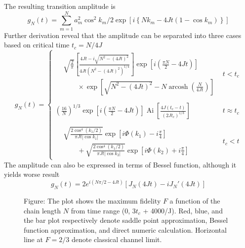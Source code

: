 \documentclass[../../../main.tex]{subfiles}
\begin{document}
The resulting transition amplitude is
\begin{equation*}
  g_N(t) = \sum_{m =1} ^{N} a_m ^ 2\cos^2 k_m/2 \exp \left[i \left\{Nk_m - 4Jt (1-\cos k_m)  \right\}  \right]
\end{equation*}
Further derivation reveal that the amplitude can be separated into three cases based on critical time $t_c = N/4J$
\begin{equation*}
  g_N(t) =
  \begin{cases}
    \begin{aligned}
       & \sqrt{\frac{2}{\pi}} \left[ \frac{4Jt - i \sqrt{N^2 - (4Jt)^2}}{4Jt \left( N^2 - (4Jt)^2 \right)^{1/4}} \right]
      \exp\left[ i\left( \frac{\pi N}{2} - 4Jt \right) \right]                                                           \\
       & \qquad \times \exp\left[\sqrt{N^2 - (4Jt)^2} -N \operatorname{arcosh} \left(\frac{N}{4Jt}\right)  \right]
    \end{aligned}
     & t<t_c         \\\\
    \left(\frac{16}{N}\right)^{1/3} \exp \left[ i \left( \frac{\pi N}{2} - 4Jt \right) \right] \operatorname{Ai}\left[ \frac{4J(t_c - t) }{(2Jt_c)^{1/3}}   \right]
     & t \approx t_c \\\\
    \begin{aligned}
       & \sqrt{\frac{2 \cos^4 (k_1/2)}{\pi Jt |\cos k_1|}} \exp \left[ i\Phi(k_1) -i \frac{\pi }{4}\right]           \\
       & \qquad + \sqrt{\frac{2 \cos^4 (k_1/2)}{\pi Jt |\cos k_2|}} \exp \left[i\Phi(k_2) +i \frac{\pi }{4}  \right]
    \end{aligned}
     & t_c <t
  \end{cases}
\end{equation*}
The amplitude can also be expressed in terms of Bessel function, although it yields worse result
\begin{equation*}
  g_N(t)
  =2 e^{i(N\pi/2 -4Jt)}  \left[ J_{N}(4Jt) -i  J_N' (4Jt)\right]
\end{equation*}

\begin{figure}
  \centering
  \caption*{Figure: The plot shows the maximum fidelity $F$ a function of the chain length $N$ from time range (0, $3t_c$ + 4000/J). Red, blue, and the bar plot respectively denote saddle point approximation, Bessel function approximation, and direct numeric calculation. Horizontal line at $F= 2/3$ denote classical channel limit.}
\end{figure}
\end{document}
